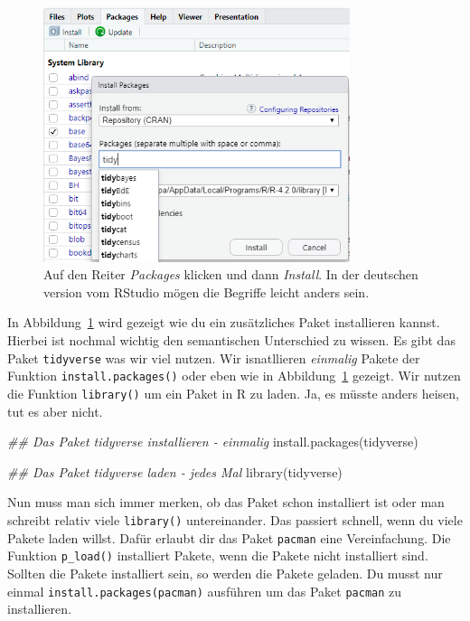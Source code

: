 \documentclass[
  letterpaper,
  DIV=11,
  oneside]{scrreport}
\newenvironment{Shaded}{\begin{snugshade}}{\end{snugshade}}
\newcommand{\DocumentationTok}[1]{\textcolor[rgb]{0.37,0.37,0.37}{\textit{#1}}}
\newcommand{\FunctionTok}[1]{\textcolor[rgb]{0.28,0.35,0.67}{#1}}
\newcommand{\NormalTok}[1]{\textcolor[rgb]{0.00,0.23,0.31}{#1}}
\begin{document}
\begin{figure}

{\centering \includegraphics[width=0.8\textwidth,height=\textheight]{./images/programing_01.PNG}

}

\caption{\label{fig-pro-01}Auf den Reiter \emph{Packages} klicken und
dann \emph{Install}. In der deutschen version vom RStudio mögen die
Begriffe leicht anders sein.}

\end{figure}

In Abbildung~\ref{fig-pro-01} wird gezeigt wie du ein zusätzliches Paket
installieren kannst. Hierbei ist nochmal wichtig den semantischen
Unterschied zu wissen. Es gibt das Paket \texttt{tidyverse} was wir viel
nutzen. Wir isnatllieren \emph{einmalig} Pakete der Funktion
\texttt{install.packages()} oder eben wie in Abbildung~\ref{fig-pro-01}
gezeigt. Wir nutzen die Funktion \texttt{library()} um ein Paket in R zu
laden. Ja, es müsste anders heisen, tut es aber nicht.

\begin{Shaded}
\begin{Highlighting}[]
\DocumentationTok{\#\# Das Paket tidyverse installieren {-} einmalig}
\FunctionTok{install.packages}\NormalTok{(tidyverse)}

\DocumentationTok{\#\# Das Paket tidyverse laden {-} jedes Mal}
\FunctionTok{library}\NormalTok{(tidyverse)}
\end{Highlighting}
\end{Shaded}

Nun muss man sich immer merken, ob das Paket schon installiert ist oder
man schreibt relativ viele \texttt{library()} untereinander. Das
passiert schnell, wenn du viele Pakete laden willst. Dafür erlaubt dir
das Paket \texttt{pacman} eine Vereinfachung. Die Funktion
\texttt{p\_load()} installiert Pakete, wenn die Pakete nicht installiert
sind. Sollten die Pakete installiert sein, so werden die Pakete geladen.
Du musst nur einmal \texttt{install.packages(pacman)} ausführen um das
Paket \texttt{pacman} zu installieren.
\end{document}
